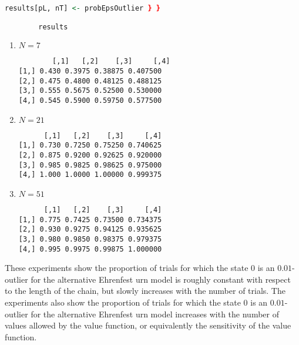 \documentclass[12pt]{article}
\begin{document}
\begin{solution}
\begin{lstlisting}[language=R]
        results[pL, nT] <- probEpsOutlier } }

        results
\end{lstlisting}

    \begin{enumerate}
        \item
            \( N= 7 \)

\begin{verbatim}
        [,1]   [,2]    [,3]     [,4]
[1,] 0.430 0.3975 0.38875 0.407500
[2,] 0.475 0.4800 0.48125 0.488125
[3,] 0.555 0.5675 0.52500 0.530000
[4,] 0.545 0.5900 0.59750 0.577500
\end{verbatim}
        \item

            \( N = 21 \)

\begin{verbatim}
      [,1]   [,2]    [,3]     [,4]
[1,] 0.730 0.7250 0.75250 0.740625
[2,] 0.875 0.9200 0.92625 0.920000
[3,] 0.985 0.9825 0.98625 0.975000
[4,] 1.000 1.0000 1.00000 0.999375
\end{verbatim}

        \item
            \( N = 51 \)

\begin{verbatim}
      [,1]   [,2]    [,3]     [,4]
[1,] 0.775 0.7425 0.73500 0.734375
[2,] 0.930 0.9275 0.94125 0.935625
[3,] 0.980 0.9850 0.98375 0.979375
[4,] 0.995 0.9975 0.99875 1.000000
\end{verbatim}

    \end{enumerate}

    These experiments show the proportion of trials for which the state \(
    0 \) is an \( 0.01 \)-outlier for the alternative Ehrenfest urn
    model is roughly constant with respect to the length of the chain,
    but slowly increases with the number of trials.  The experiments
    also show the proportion of trials for which the state \( 0 \) is an
    \( 0.01 \)-outlier for the alternative Ehrenfest urn model increases
    with the number of values allowed by the value function, or
    equivalently the sensitivity of the value function.
\end{solution}
\end{document}

